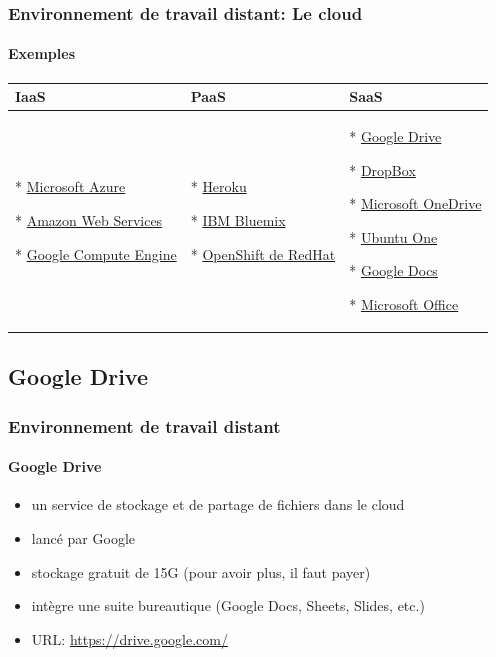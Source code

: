 \documentclass{beamer}
\begin{document}
\begin{frame}
\frametitle{Environnement de travail distant: Le cloud}
\framesubtitle{Exemples}

\begin{tabular}{p{}p{}p{}}
	\hline\hline
	IaaS  & PaaS & SaaS \\
	\hline
	
	* \href{http://azure.microsoft.com/}{Microsoft Azure}
	
	* \href{https://aws.amazon.com}{Amazon Web Services}
	
	* \href{https://cloud.google.com/compute/}{Google Compute Engine}
	
	&
	
	* \href{https://www.heroku.com}{Heroku}
	
	* \href{https://www.ibm.com/cloud-computing/bluemix/}{IBM Bluemix}
	
	* \href{https://www.openshift.org/}{OpenShift de RedHat}
	
	&
	
	* \href{https://www.google.com/drive/}{Google Drive}
	
	* \href{https://www.dropbox.com/}{DropBox}
	
	* \href{https://onedrive.live.com/}{Microsoft OneDrive}
	
	* \href{http://one.ubuntu.com/}{Ubuntu One}
	 
	* \href{https://docs.google.com/}{Google Docs}
	
	* \href{https://microsoftonline.com}{Microsoft Office}
	\\
	\hline\hline
\end{tabular}


\end{frame}

\subsection{Google Drive}

\begin{frame}
\frametitle{Environnement de travail distant}
\framesubtitle{Google Drive}

\begin{itemize}
	\item un service de stockage et de partage de fichiers dans le cloud
	\item lancé par Google
	\item stockage gratuit de 15G (pour avoir plus, il faut payer)
	\item intègre une suite bureautique (Google Docs, Sheets, Slides, etc.)
	\item URL: \url{https://drive.google.com/}
\end{itemize}

\end{frame}
\end{document}
